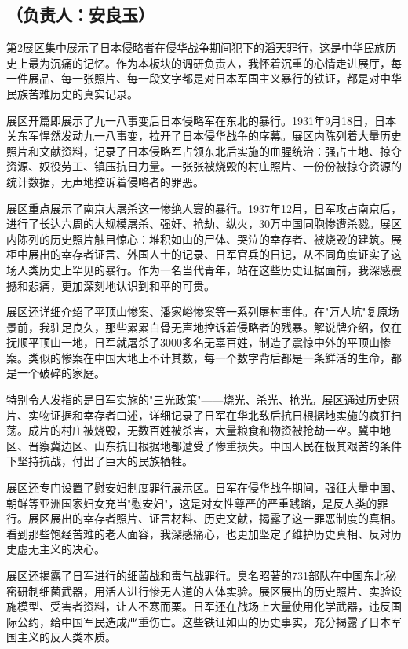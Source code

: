 \documentclass[a4paper,12pt]{article}
\begin{document}
\subsection*{\songti{}\textbf{（负责人：安良玉）}}

第2展区集中展示了日本侵略者在侵华战争期间犯下的滔天罪行，这是中华民族历史上最为沉痛的记忆。作为本板块的调研负责人，我怀着沉重的心情走进展厅，每一件展品、每一张照片、每一段文字都是对日本军国主义暴行的铁证，都是对中华民族苦难历史的真实记录。

展区开篇即展示了九一八事变后日本侵略军在东北的暴行。1931年9月18日，日本关东军悍然发动九一八事变，拉开了日本侵华战争的序幕。展区内陈列着大量历史照片和文献资料，记录了日本侵略军占领东北后实施的血腥统治：强占土地、掠夺资源、奴役劳工、镇压抗日力量。一张张被烧毁的村庄照片、一份份被掠夺资源的统计数据，无声地控诉着侵略者的罪恶。

展区重点展示了南京大屠杀这一惨绝人寰的暴行。1937年12月，日军攻占南京后，进行了长达六周的大规模屠杀、强奸、抢劫、纵火，30万中国同胞惨遭杀戮。展区内陈列的历史照片触目惊心：堆积如山的尸体、哭泣的幸存者、被烧毁的建筑。展柜中展出的幸存者证言、外国人士的记录、日军官兵的日记，从不同角度证实了这场人类历史上罕见的暴行。作为一名当代青年，站在这些历史证据面前，我深感震撼和悲痛，更加深刻地认识到和平的可贵。

展区还详细介绍了平顶山惨案、潘家峪惨案等一系列屠村事件。在"万人坑"复原场景前，我驻足良久，那些累累白骨无声地控诉着侵略者的残暴。解说牌介绍，仅在抚顺平顶山一地，日军就屠杀了3000多名无辜百姓，制造了震惊中外的平顶山惨案。类似的惨案在中国大地上不计其数，每一个数字背后都是一条鲜活的生命，都是一个破碎的家庭。

特别令人发指的是日军实施的"三光政策"——烧光、杀光、抢光。展区通过历史照片、实物证据和幸存者口述，详细记录了日军在华北敌后抗日根据地实施的疯狂扫荡。成片的村庄被烧毁，无数百姓被杀害，大量粮食和物资被抢劫一空。冀中地区、晋察冀边区、山东抗日根据地都遭受了惨重损失。中国人民在极其艰苦的条件下坚持抗战，付出了巨大的民族牺牲。

展区还专门设置了慰安妇制度罪行展示区。日军在侵华战争期间，强征大量中国、朝鲜等亚洲国家妇女充当"慰安妇"，这是对女性尊严的严重践踏，是反人类的罪行。展区展出的幸存者照片、证言材料、历史文献，揭露了这一罪恶制度的真相。看到那些饱经苦难的老人面容，我深感痛心，也更加坚定了维护历史真相、反对历史虚无主义的决心。

展区还揭露了日军进行的细菌战和毒气战罪行。臭名昭著的731部队在中国东北秘密研制细菌武器，用活人进行惨无人道的人体实验。展区展出的历史照片、实验设施模型、受害者资料，让人不寒而栗。日军还在战场上大量使用化学武器，违反国际公约，给中国军民造成严重伤亡。这些铁证如山的历史事实，充分揭露了日本军国主义的反人类本质。
\end{document}
